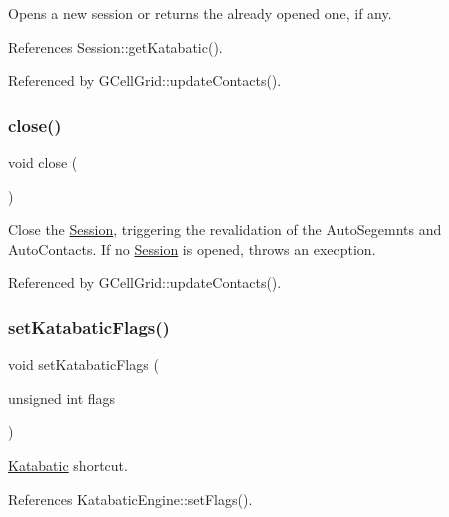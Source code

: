 Opens a new session or returns the already opened one, if any. 

References Session\+::get\+Katabatic().



Referenced by G\+Cell\+Grid\+::update\+Contacts().

\mbox{\label{classKatabatic_1_1Session_a5ae591df94fc66ccb85cbb6565368bca}} 
\subsubsection{\texorpdfstring{close()}{close()}}
{\footnotesize\ttfamily void close (\begin{DoxyParamCaption}{ }\end{DoxyParamCaption})\hspace{0.3cm}{\ttfamily [static]}}

Close the \mbox{\hyperlink{classKatabatic_1_1Session}{Session}}, triggering the revalidation of the Auto\+Segemnts and Auto\+Contacts. If no \mbox{\hyperlink{classKatabatic_1_1Session}{Session}} is opened, throws an execption. 

Referenced by G\+Cell\+Grid\+::update\+Contacts().

\mbox{\label{classKatabatic_1_1Session_af9919aefa1db2478b3d1813c1872d175}} 
\subsubsection{\texorpdfstring{set\+Katabatic\+Flags()}{setKatabaticFlags()}}
{\footnotesize\ttfamily void set\+Katabatic\+Flags (\begin{DoxyParamCaption}\item[{unsigned int}]{flags }\end{DoxyParamCaption})\hspace{0.3cm}{\ttfamily [static]}}

\mbox{\hyperlink{namespaceKatabatic}{Katabatic}} shortcut. 

References Katabatic\+Engine\+::set\+Flags().

